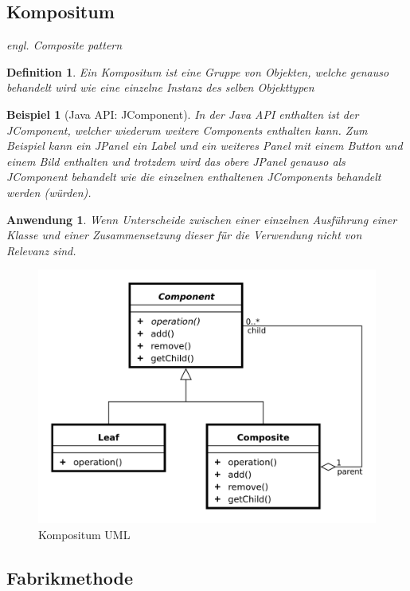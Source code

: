\documentclass[a4paper]{article}
\theoremstyle{break}
\newtheorem{defi}{Definition}[section]
\newtheorem{ex}{Beispiel}[section]
\newtheorem{why}{Anwendung}[section]
\begin{document}
\newpage
\subsection{Kompositum}

\textit{engl. Composite pattern}

\begin{defi}
	Ein Kompositum ist eine Gruppe von Objekten, welche genauso behandelt wird wie eine einzelne Instanz des selben Objekttypen
\end{defi}

\begin{ex}[Java API: JComponent]
	In der Java API enthalten ist der JComponent, welcher wiederum weitere Components enthalten kann.
	Zum Beispiel kann ein JPanel ein Label und ein weiteres Panel mit einem Button und einem Bild enthalten und trotzdem wird das obere JPanel genauso als JComponent behandelt wie die einzelnen enthaltenen JComponents behandelt werden (würden).
\end{ex}

\begin{why}
	Wenn Unterscheide zwischen einer einzelnen Ausführung einer Klasse und einer Zusammensetzung dieser für die Verwendung nicht von Relevanz sind.
\end{why}
\begin{figure}[H]
	\centering
	\includegraphics[width=\textwidth]{../uml/CompositePattern.png}
	\caption{Kompositum UML}
	\label{fig3}
\end{figure}

\newpage
\subsection{Fabrikmethode}
\end{document}
